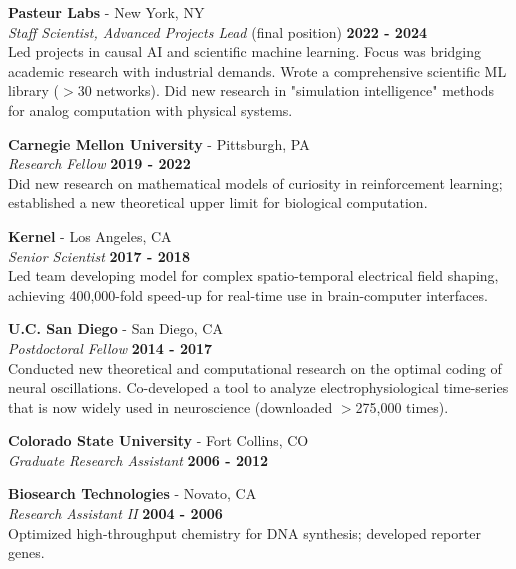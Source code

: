 \documentclass[margin,line]{res}
\begin{document}
\begin{resume}
\vspace{-.25cm}
{\bf Pasteur Labs} - New York, NY\\
{\em Staff Scientist, Advanced Projects Lead} (final position) \hfill {\bf 2022 - 2024}\\
Led projects in causal AI and scientific machine learning. Focus was bridging academic research with industrial demands. Wrote a comprehensive scientific ML library ($>$30 networks). Did new research in  "simulation intelligence" methods for analog computation with physical systems.


\vspace{-.25cm}
{\bf Carnegie Mellon University} - Pittsburgh, PA\\
{\em Research Fellow} \hfill {\bf 2019 - 2022}\\
Did new research on mathematical models of curiosity in reinforcement learning; established a new theoretical upper limit for biological computation.

\vspace{-.25cm}
{\bf Kernel} - Los Angeles, CA\\
{\em Senior Scientist} \hfill {\bf 2017 - 2018}\\
Led team developing model for complex spatio-temporal electrical field shaping, achieving 400,000-fold speed-up for real-time use in brain-computer interfaces.

\vspace{-.25cm}
{\bf U.C. San Diego} - San Diego, CA\\
{\em Postdoctoral Fellow} \hfill {\bf 2014 - 2017}\\
Conducted new theoretical and computational research on the optimal coding of neural oscillations. Co-developed a tool to analyze electrophysiological time-series that is now widely used in neuroscience (downloaded $>$275,000 times).

\vspace{-.25cm}
{\bf Colorado State University} - Fort Collins, CO\\
{\em Graduate Research Assistant} \hfill {\bf 2006 - 2012}

\vspace{-.25cm}
{\bf Biosearch Technologies} - Novato, CA\\
{\em Research Assistant II} \hfill {\bf 2004 - 2006}\\
Optimized high-throughput chemistry for DNA synthesis; developed reporter genes.


\end{resume}
\end{document}
